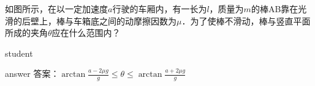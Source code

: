 \begin{example}
	 如图所示，在以一定加速度$ a $行驶的车厢内，有一长为$ l $，质量为$ m $的棒AB靠在光滑的后壁上，棒与车箱底之间的动摩擦因数为$ \mu $．为了使棒不滑动，棒与竖直平面所成的夹角$ \theta $应在什么范围内？
	
	\begin{taggedblock}{student}
		\vspace*{2cm}
	\end{taggedblock}
	
	
	\begin{taggedblock}{answer}
		答案：$ \arctan\frac{a-2\mu g}{g}\le \theta \le \arctan\frac{a+2\mu g}{g} $
	\end{taggedblock}
	

\end{example}

